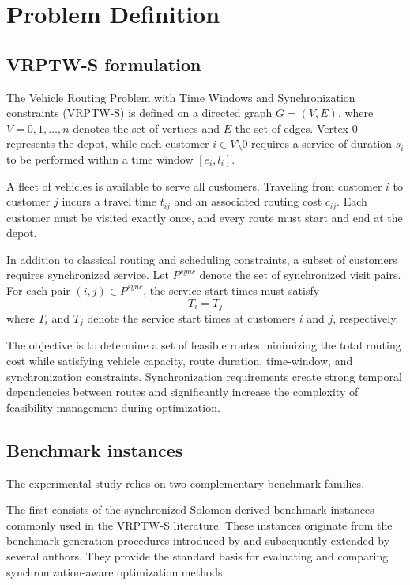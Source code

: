 \section{Problem Definition} 
\label{sec:problem}

\subsection{VRPTW-S formulation}
The Vehicle Routing Problem with Time Windows and Synchronization constraints (VRPTW-S) is defined on a directed graph $G=(V,E)$, where $V={0,1,\dots,n}$ denotes the set of vertices and $E$ the set of edges. Vertex $0$ represents the depot, while each customer $i \in V\setminus{0}$ requires a service of duration $s_i$ to be performed within a time window $[e_i,l_i]$.

A fleet of vehicles is available to serve all customers. Traveling from customer $i$ to customer $j$ incurs a travel time $t_{ij}$ and an associated routing cost $c_{ij}$. Each customer must be visited exactly once, and every route must start and end at the depot.

In addition to classical routing and scheduling constraints, a subset of customers requires synchronized service. Let $P^{sync}$ denote the set of synchronized visit pairs. For each pair $(i,j)\in P^{sync}$, the service start times must satisfy
\[ T_i = T_j \]
where $T_i$ and $T_j$ denote the service start times at customers $i$ and $j$, respectively.

The objective is to determine a set of feasible routes minimizing the total routing cost while satisfying vehicle capacity, route duration, time-window, and synchronization constraints. Synchronization requirements create strong temporal dependencies between routes and significantly increase the complexity of feasibility management during optimization.

\subsection{Benchmark instances}
The experimental study relies on two complementary benchmark families.

The first consists of the synchronized Solomon-derived benchmark instances commonly used in the VRPTW-S literature. These instances originate from the benchmark generation procedures introduced by \citet{bredstrom2008combined} and subsequently extended by several authors. They provide the standard basis for evaluating and comparing synchronization-aware optimization methods.

